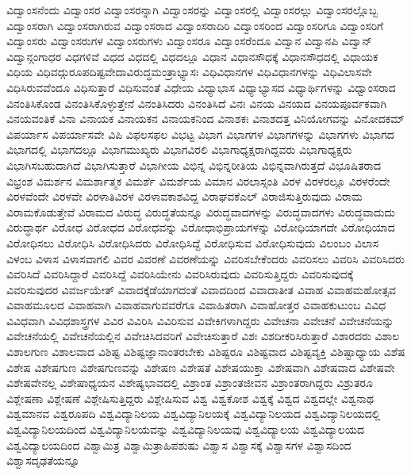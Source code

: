 {ವಿದ್ವಾಂಸನೆಂದು
ವಿದ್ವಾಂಸರ
ವಿದ್ವಾಂಸರನ್ನಾಗಿ
ವಿದ್ವಾಂಸರನ್ನು
ವಿದ್ವಾಂಸರಲ್ಲಿ
ವಿದ್ವಾಂಸರಲ್ಲು
ವಿದ್ವಾಂಸರಲ್ಲೊಬ್ಬ
ವಿದ್ವಾಂಸರಾಗಿ
ವಿದ್ವಾಂಸರಾಗಿರುವ
ವಿದ್ವಾಂಸರಾದ
ವಿದ್ವಾಂಸರಾದಿರಿ
ವಿದ್ವಾಂಸರಿಂದ
ವಿದ್ವಾಂಸರಿಗೂ
ವಿದ್ವಾಂಸರಿಗೆ
ವಿದ್ವಾಂಸರು
ವಿದ್ವಾಂಸರುಗಳ
ವಿದ್ವಾಂಸರುಗಳು
ವಿದ್ವಾಂಸರೂ
ವಿದ್ವಾಂಸರೆಂದೂ
ವಿದ್ವಾನ
ವಿದ್ವಾನಪಿ
ವಿದ್ವಾನ್
ವಿದ್ವಾನ್ಗಂಗಾಧರ
ವಿಧಗಳಿವೆ
ವಿಧದ
ವಿಧದಲ್ಲಿ
ವಿಧದಲ್ಲೂ
ವಿಧಾನ
ವಿಧಾನಸೌಧಕ್ಕೆ
ವಿಧಾನಸೌಧದಲ್ಲಿ
ವಿಧಾಯಕ
ವಿಧಿಯ
ವಿಧಿವದ್ಗುರೂಪದಿಷ್ಟವೇದಾವಿರುದ್ಧಮಂತ್ರಾಭ್ಯಾಸಃ
ವಿಧಿವಿಧಾನಗಳ
ವಿಧಿವಿಧಾನಗಳನ್ನು
ವಿಧಿವಿಲಾಸವೇ
ವಿಧಿಸಿರುವವೆಂದೂ
ವಿಧಿಸುತ್ತಾರೆ
ವಿಧಿಸುವಂತೆ
ವಿಧೇಯ
ವಿಧ್ಯಾಭಾಸ
ವಿಧ್ಯಾಭ್ಯಾಸದ
ವಿಧ್ಯಾರ್ಥಿಗಳನ್ನು
ವಿಧ್ವಾಂಸರಾದ
ವಿನಂತಿಸಿಕೊಂಡ
ವಿನಂತಿಸಿಕೊಳ್ಳುತ್ತೇನೆ
ವಿನಂತಿಸಿದರು
ವಿನಂತಿಸಿದೆ
ವಿನಃ
ವಿನಯ
ವಿನಯದ
ವಿನಯಪೂರ್ವಕವಾಗಿ
ವಿನಯವಂತಿಕೆ
ವಿನಾ
ವಿನಾಯಕ
ವಿನಾಯಕನ
ವಿನಾಯಕನಿಂದ
ವಿನಾಶಕಃ
ವಿನಾಶದತ್ತ
ವಿನಿಯೋಗವನ್ನು
ವಿನೋದಕಮ್
ವಿಪರ್ಯಾಸ
ವಿಪರ್ಯಾಸವೇ
ವಿಪಿ
ವಿಫಲಸಫಲ
ವಿಭಟ್ಟ
ವಿಭಾಗ
ವಿಭಾಗಗಳ
ವಿಭಾಗಗಳನ್ನು
ವಿಭಾಗಗಳು
ವಿಭಾಗದ
ವಿಭಾಗದಲ್ಲಿ
ವಿಭಾಗದಲ್ಲೂ
ವಿಭಾಗಮುಖ್ಯರು
ವಿಭಾಗವಿರಲಿ
ವಿಭಾಗಾಧ್ಯಕ್ಷರಾಗಿದ್ದವರು
ವಿಭಾಗಾಧ್ಯಕ್ಷರು
ವಿಭಾಗಿಸಬಹುದಾಗಿದೆ
ವಿಭಾಗಿಸುತ್ತಾರೆ
ವಿಭಾಗೀಯ
ವಿಭಿನ್ನ
ವಿಭಿನ್ನರೀತಿಯ
ವಿಭಿನ್ನವಾಗಿರುತ್ತದೆ
ವಿಭೂಷಿತರಾದ
ವಿಭ್ರಂಶ
ವಿಮರ್ಶನ
ವಿಮರ್ಶಾತ್ಮಕ
ವಿಮರ್ಶೆ
ವಿಮರ್ಶೆಯ
ವಿಮಾನ
ವಿರಲಾಸ್ಸಂತಿ
ವಿರಳ
ವಿರಳರಲ್ಲೂ
ವಿರಳರೆಂದೇ
ವಿರಳವೆಂದೇ
ವಿರಳವೇ
ವಿರಳಾತಿವಿರಳ
ವಿರಳಾವಕಾಶವಿದ್ದ
ವಿರಾಘವಕೆಎಲ್
ವಿರಾಜಿಸುತ್ತಿರುವುದು
ವಿರಾಮ
ವಿರಾಮಕೊಡುತ್ತೇವೆ
ವಿರಾಮದ
ವಿರುದ್ಧ
ವಿರುದ್ಧತೆಯನ್ನೂ
ವಿರುದ್ಧವಾದಗಳನ್ನು
ವಿರುದ್ಧವಾದಗಳು
ವಿರುದ್ಧವಾದುದು
ವಿರುದ್ಧಾರ್ಥ
ವಿರೋಧ
ವಿರೋಧದ
ವಿರೋಧವನ್ನು
ವಿರೋಧಾಭಿಪ್ರಾಯಗಳನ್ನು
ವಿರೋಧಿಯಾಗದೇ
ವಿರೋಧಿಯಾದ
ವಿರೋಧಿಸಲು
ವಿರೋಧಿಸಿ
ವಿರೋಧಿಸಿದರು
ವಿರೋಧಿಸಿದ್ದೆ
ವಿರೋಧಿಸುವ
ವಿರೋಧಿಸುವುದು
ವಿಲಂಬಂ
ವಿಲಾಸ
ವಿಳಂಬ
ವಿಳಾಸ
ವಿಳಾಸವಾಗಲಿ
ವಿವರ
ವಿವರಣೆ
ವಿವರಣೆಯನ್ನು
ವಿವರಿಸಬೇಕೆಂದರು
ವಿವರಿಸಲು
ವಿವರಿಸಿ
ವಿವರಿಸಿದರು
ವಿವರಿಸಿದೆ
ವಿವರಿಸಿದ್ದಾರೆ
ವಿವರಿಸಿದ್ದೆ
ವಿವರಿಸಿಯೇನು
ವಿವರಿಸಿರುವುದು
ವಿವರಿಸುತ್ತಿದ್ದರು
ವಿವರಿಸುವುದಕ್ಕೆ
ವಿವರಿಸುವುದರ
ವಿವರ್ಜಯೇತ್
ವಿವಾದಕ್ಕೆಡೆಯಾಗದಂತೆ
ವಿವಾದದಿಂದ
ವಿವಾದಾತೀತ
ವಿವಾಹ
ವಿವಾಹಮಹೋತ್ಸವ
ವಿವಾಹಮೂಲದ
ವಿವಾಹವಾಗಿ
ವಿವಾಹವಾಗುವವರೆಗೂ
ವಿವಾಹಿತರಾಗಿ
ವಿವಾಹೋತ್ತರ
ವಿವಾಹಕುಟುಂಬ
ವಿವಿಧ
ವಿವಿಧವಾಗಿ
ವಿವಿಧಶಾಸ್ತ್ರಗಳ
ವಿವಿರ
ವಿವಿರಿಸಿ
ವಿವಿರಿಸುವ
ವಿವೇಕಿಗಳಾಗಿದ್ದರು
ವಿವೇಚನಾ
ವಿವೇಚನೆ
ವಿವೇಚನೆಯನ್ನು
ವಿವೇಚನೆಯಲ್ಲಿ
ವಿವೇಚನೆಯಲ್ಲಿನ
ವಿವೇಚಿಸಿದವರಿಗೆ
ವಿವೇಚಿಸುತ್ತಾರೆ
ವಿಶಃ
ವಿಶದೀಕರಿಸಿರುತ್ತಾರೆ
ವಿಶಾರದರು
ವಿಶಾಲ
ವಿಶಾಲಗುಣ
ವಿಶಾಲವಾದ
ವಿಶಿಷ್ಟ
ವಿಶಿಷ್ಟಜ್ಞಾನಾಂತರಬೇಕು
ವಿಶಿಷ್ಟರೂ
ವಿಶಿಷ್ಟವಾದ
ವಿಶಿಷ್ಟವ್ಯಕ್ತಿ
ವಿಶಿಷ್ಟಾಧ್ಯಾಯ
ವಿಶೆಷ
ವಿಶೇಷ
ವಿಶೇಷಗುಣ
ವಿಶೇಷಗುಣವನ್ನು
ವಿಶೇಷಣ
ವಿಶೇಷತೆ
ವಿಶೇಷಯುಕ್ತಾ
ವಿಶೇಷವಾಗಿ
ವಿಶೇಷವಾದ
ವಿಶೇಷವೇ
ವಿಶೇಷವೇನಲ್ಲ
ವಿಶೇಷಾಧ್ಯಯನ
ವಿಶೇಷ್ಯಭಾವದಲ್ಲಿ
ವಿಶ್ರಾಂತ
ವಿಶ್ರಾಂತಜೀವನ
ವಿಶ್ರಾಂತರಾಗಿದ್ದರು
ವಿಶ್ರುತರೂ
ವಿಶ್ಲೇಷಣಾ
ವಿಶ್ಲೇಷಣೆ
ವಿಶ್ಲೇಷಿಸುತ್ತಿದ್ದರು
ವಿಶ್ಲೇಷಿಸುವ
ವಿಶ್ವ
ವಿಶ್ವಕೋಶ
ವಿಶ್ವಕ್ಕೆ
ವಿಶ್ವದ
ವಿಶ್ವದಲ್ಲೇ
ವಿಶ್ವನಾಥ
ವಿಶ್ವಮಾನವ
ವಿಶ್ವರೂಪದಿ
ವಿಶ್ವವಿದ್ಯಾನಿಲಯ
ವಿಶ್ವವಿದ್ಯಾನಿಲಯಕ್ಕೆ
ವಿಶ್ವವಿದ್ಯಾನಿಲಯದ
ವಿಶ್ವವಿದ್ಯಾನಿಲಯದಲ್ಲಿ
ವಿಶ್ವವಿದ್ಯಾನಿಲಯದಿಂದ
ವಿಶ್ವವಿದ್ಯಾನಿಲಯವನ್ನು
ವಿಶ್ವವಿದ್ಯಾನಿಲಯವು
ವಿಶ್ವವಿದ್ಯಾಲಯ
ವಿಶ್ವವಿದ್ಯಾಲಯದ
ವಿಶ್ವವಿದ್ಯಾಲಯದಿಂದ
ವಿಶ್ವಾಮಿತ್ರ
ವಿಶ್ವಾಮಿತ್ರಾಹಿಪಶುಷು
ವಿಶ್ವಾಸ
ವಿಶ್ವಾಸಕ್ಕೆ
ವಿಶ್ವಾಸಗಳ
ವಿಶ್ವಾಸದಿಂದ
ವಿಶ್ವಾಸದೃಢತೆಯನ್ನೂ
}
